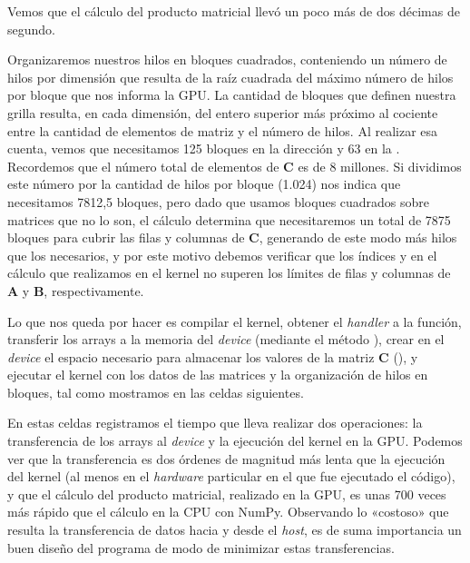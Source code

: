 
Vemos que el cálculo del producto matricial llevó un poco más de dos décimas de segundo.

Organizaremos nuestros hilos en bloques cuadrados, conteniendo un número de hilos por dimensión que resulta de la raíz cuadrada del máximo número de hilos por bloque que nos informa la GPU. La cantidad de bloques que definen nuestra grilla resulta, en cada dimensión, del entero superior más próximo al cociente entre la cantidad de elementos de matriz y el número de hilos. Al realizar esa cuenta, vemos que necesitamos 125 bloques en la dirección  y 63 en la . Recordemos que el número total de elementos de $\bm{C}$ es de 8 millones. Si dividimos este número por la cantidad de hilos por bloque (1.024) nos indica que necesitamos 7812,5 bloques, pero dado que usamos bloques cuadrados sobre matrices que no lo son, el cálculo determina que necesitaremos un total de 7875 bloques para cubrir las filas y columnas de $\bm{C}$, generando de este modo más hilos que los necesarios, y por este motivo debemos verificar que los índices  y  en el cálculo que realizamos en el kernel no superen los límites de filas y columnas de $\bm{A}$ y $\bm{B}$, respectivamente.


Lo que nos queda por hacer es compilar el kernel, obtener el \textit{handler} a la función, transferir los arrays a la memoria del \textit{device} (mediante el método ), crear en el \textit{device} el espacio necesario para almacenar los valores de la matriz $\bm{C}$ (), y ejecutar el kernel con los datos de las matrices y la organización de hilos en bloques, tal como mostramos en las celdas siguientes.


En estas celdas registramos el tiempo que lleva realizar dos operaciones: la transferencia de los arrays al \textit{device} y la ejecución del kernel en la GPU. Podemos ver que la transferencia es dos órdenes de magnitud más lenta que la ejecución del kernel (al menos en el \textit{hardware} particular en el que fue ejecutado el código), y que el cálculo del producto matricial, realizado en la GPU, es unas 700 veces más rápido que el cálculo en la CPU con NumPy. Observando lo «costoso» que resulta la transferencia de datos hacia y desde el \textit{host}, es de suma importancia un buen diseño del programa de modo de minimizar estas transferencias.


